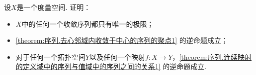 
\begin{example}
设\(X\)是一个度量空间.
证明：\begin{itemize}
	\item \(X\)中的任何一个收敛序列都只有唯一的极限；
	\item \cref{theorem:序列.去心邻域内收敛于中心的序列的聚点1} 的逆命题成立；
	\item 对于任何一个拓扑空间\(Y\)以及任何一个映射\(f\colon X \to Y\)，\cref{theorem:序列.连续映射的定义域中的序列与值域中的序列之间的关系1} 的逆命题成立.
\end{itemize}
\end{example}
